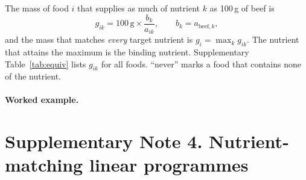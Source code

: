 \documentclass[10pt]{article}
\begin{document}
The mass of food $i$ that supplies as much of nutrient $k$ as 100\,g of beef is
\begin{equation}
g_{ik} = 100\,\mathrm{g}\times \frac{b_k}{a_{ik}}, \qquad b_k = a_{\mathrm{beef},k},
\end{equation}
and the mass that matches \emph{every} target nutrient is $g_i = \max_k g_{ik}$.
The nutrient that attains the maximum is the binding nutrient.
Supplementary Table~\ref{tab:equiv} lists $g_{ik}$ for all foods. ``never'' marks a food that
contains none of the nutrient.

\paragraph{Worked example.}


\begin{table}[p]
\centering\scriptsize
\caption{\textbf{Grams of each food (as eaten) that supply the nutrient content of 100\,g cooked beef.}
Protein, iron, zinc and vitamin B\textsubscript{12} are bioavailability-adjusted.
The last two columns give the amount needed to match all ten nutrients and the
binding nutrient. Values above 2,000\,g are shown as ``>2k''.}
\label{tab:equiv}
\resizebox{\linewidth}{!}{}
\end{table}

\section{Supplementary Note 4. Nutrient-matching linear programmes}
\label{si:lp}
\end{document}
